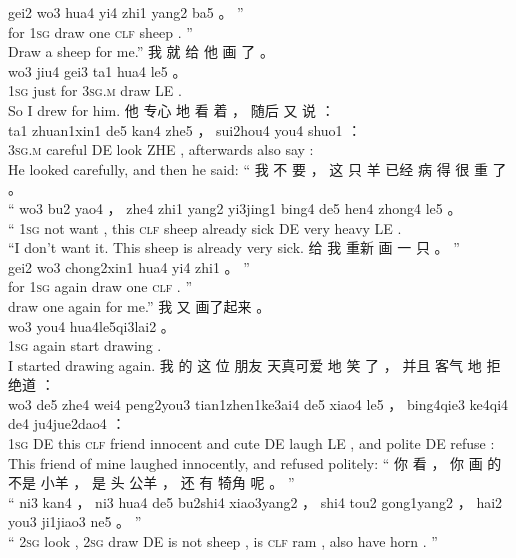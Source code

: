 \documentclass[UTF8]{ctexart}
\begin{document}
\begin{exe}
gei2 wo3 hua4 yi4 zhi1 yang2 ba5 。 ”
\\
for \textsc{1sg} draw one \textsc{clf} sheep {} . ''
\\
\trans Draw a sheep for me.''
\ex
\glll
我 就 给 他 画 了 。
\\
wo3 jiu4 gei3 ta1 hua4 le5 。
\\
\textsc{1sg} just for \textsc{3sg.m} draw LE . 
\\
\trans So I drew for him.
\ex
\glll
他 专心 地 看 着 ， 随后 又 说 ：
\\
ta1 zhuan1xin1 de5 kan4 zhe5 ， sui2hou4 you4 shuo1 ：
\\
\textsc{3sg.m} careful DE look ZHE , afterwards also say :
\\
\trans He looked carefully, and then he said:
\ex
\glll
“ 我 不 要 ， 这 只 羊 已经 病 得 很 重 了 。
\\
“ wo3 bu2 yao4 ， zhe4 zhi1 yang2 yi3jing1 bing4 de5 hen4 zhong4 le5 。
\\
`` \textsc{1sg} not want , this \textsc{clf} sheep already sick DE very heavy LE . 
\\
\trans ``I don't want it. This sheep is already very sick. 
\ex
\glll
给 我 重新 画 一 只 。 ”
\\
gei2 wo3 chong2xin1 hua4 yi4 zhi1 。 ”
\\
for \textsc{1sg} again draw one \textsc{clf} . ''
\\
\trans draw one again for me.''
\ex
\glll
我 又 画了起来 。
\\
wo3 you4 hua4le5qi3lai2 。
\\
\textsc{1sg} again {start drawing} .
\\
\trans I started drawing again.
\ex
\glll
我 的 这 位 朋友 天真可爱 地 笑 了 ， 并且 客气 地 拒绝道 ：
\\
wo3 de5 zhe4 wei4 peng2you3 tian1zhen1ke3ai4 de5 xiao4 le5 ， bing4qie3 ke4qi4 de4 ju4jue2dao4 ：
\\
\textsc{1sg} DE this \textsc{clf} friend {innocent and cute} DE laugh LE , and polite DE refuse :
\\
\trans This friend of mine laughed innocently, and refused politely:
\ex
\glll
“ 你 看 ， 你 画 的 不是 小羊 ， 是 头 公羊 ， 还 有 犄角 呢 。 ”
\\
“ ni3 kan4 ， ni3 hua4 de5 bu2shi4 xiao3yang2 ， shi4 tou2 gong1yang2 ， hai2 you3 ji1jiao3 ne5 。 ”
\\
`` \textsc{2sg} look , \textsc{2sg} draw DE {is not} sheep , is \textsc{clf} ram , also have horn {} . ''
\\

\end{exe}
\end{document}

